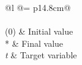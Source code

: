\begin{longtable*}{@{}l @{\quad=\quad} p{14.8cm}@{}}
	\\
	\\
	(0) & Initial value \\
	* & Final value \\
	\emph{t} & Target variable \\
	
\end{longtable*}


